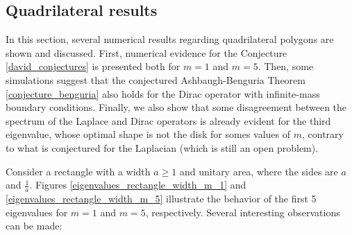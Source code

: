 \subsection{Quadrilateral results}

In this section, several numerical results regarding quadrilateral polygons are shown and discussed. First, numerical evidence for the Conjecture \ref{david_conjectures} is presented both for \(m=1\) and \(m=5\). Then, some simulations suggest that the conjectured Ashbaugh-Benguria Theorem \ref{conjecture_benguria} also holds for the Dirac operator with infinite-mass boundary conditions. Finally, we also show that some disagreement between the spectrum of the Laplace and Dirac operators is already evident for the third eigenvalue, whose optimal shape is not the disk for somes values of \(m\), contrary to what is conjectured for the Laplacian (which is still an open problem).

Consider a rectangle with a width \(a \geq 1\) and unitary area, where the sides are \(a\) and \(\frac{1}{a}\). Figures \ref{eigenvalues_rectangle_width_m_1} and \ref{eigenvalues_rectangle_width_m_5} illustrate the behavior of the first 5 eigenvalues for \(m=1\) and \(m=5\), respectively. Several interesting observations can be made:

